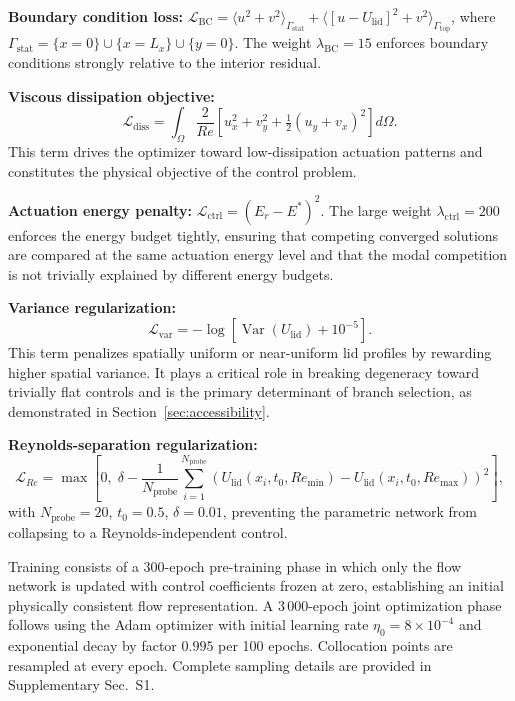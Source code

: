 \documentclass[a4paper,11pt]{article}
\begin{document}
\textbf{Boundary condition loss:}
\(\mathcal{L}_{\mathrm{BC}}=\langle u^2+v^2\rangle_{\Gamma_{\mathrm{stat}}}
+\langle[u-U_{\mathrm{lid}}]^2+v^2\rangle_{\Gamma_{\mathrm{top}}}\),
where \(\Gamma_{\mathrm{stat}}=\{x=0\}\cup\{x=L_x\}\cup\{y=0\}\). The weight
\(\lambda_{\mathrm{BC}}=15\) enforces boundary conditions strongly relative to
the interior residual.

\textbf{Viscous dissipation objective:}
\begin{equation}
\mathcal{L}_{\mathrm{diss}}=\int_\Omega\frac{2}{Re}
\!\left[u_x^2+v_y^2+\tfrac{1}{2}(u_y+v_x)^2\right]d\Omega.
\label{eq:dissipation}
\end{equation}
This term drives the optimizer toward low-dissipation actuation patterns and
constitutes the physical objective of the control problem.

\textbf{Actuation energy penalty:}
\(\mathcal{L}_{\mathrm{ctrl}}=(E_r-E^*)^2\). The large weight
\(\lambda_{\mathrm{ctrl}}=200\) enforces the energy budget tightly, ensuring that
competing converged solutions are compared at the same actuation energy level and
that the modal competition is not trivially explained by different energy budgets.

\textbf{Variance regularization:}
\begin{equation}
\mathcal{L}_{\mathrm{var}}=-\log\!\left[\operatorname{Var}(U_{\mathrm{lid}})+10^{-5}\right].
\label{eq:var_loss}
\end{equation}
This term penalizes spatially uniform or near-uniform lid profiles by rewarding
higher spatial variance. It plays a critical role in breaking degeneracy toward
trivially flat controls and is the primary determinant of branch selection, as
demonstrated in Section~\ref{sec:accessibility}.

\textbf{Reynolds-separation regularization:}
\begin{equation}
\mathcal{L}_{Re}=\max\!\left[0,\;\delta-
\frac{1}{N_{\mathrm{probe}}}\sum_{i=1}^{N_{\mathrm{probe}}}
\!\left(U_{\mathrm{lid}}(x_i,t_0,Re_{\min})
-U_{\mathrm{lid}}(x_i,t_0,Re_{\max})\right)^2\right],
\end{equation}
with \(N_{\mathrm{probe}}=20\), \(t_0=0.5\), \(\delta=0.01\), preventing the
parametric network from collapsing to a Reynolds-independent control.

Training consists of a 300-epoch pre-training phase in which only the flow network
is updated with control coefficients frozen at zero, establishing an initial
physically consistent flow representation. A 3\,000-epoch joint optimization phase
follows using the Adam optimizer with initial learning rate \(\eta_0=8\times10^{-4}\)
and exponential decay by factor \(0.995\) per 100 epochs. Collocation points are
resampled at every epoch. Complete sampling details are provided in
Supplementary Sec.~S1.
\end{document}
